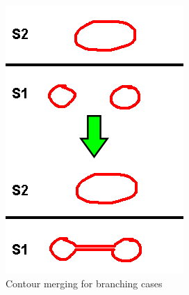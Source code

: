 \documentclass[11p, titlepage]{article}
\begin{document}
\begin{figure}[h]
     \centering
     \begin{subfigure}[b]{0.3\textwidth}
         \centering
         \includegraphics[width=\textwidth]{diagrams/contour_merging}
         \caption{Contour merging for branching cases}
         \label{fig:contour_merging}
     \end{subfigure}
     \hfill
     \begin{subfigure}[b]{0.4\textwidth}
         \centering

\end{subfigure}
\end{figure}
\end{document}
